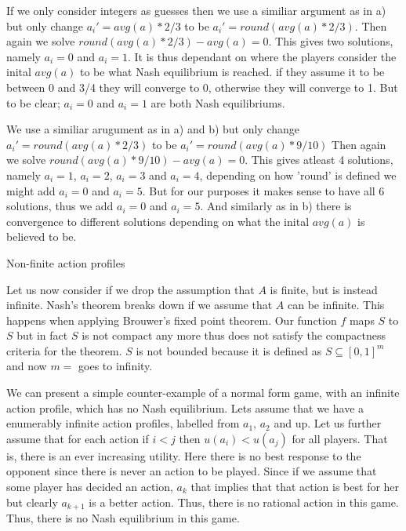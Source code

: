 \documentclass[12pt]{article}
\newenvironment{question}[2][Question]{\begin{trivlist}
\item[\hskip \labelsep {\bfseries #1}\hskip \labelsep {\bfseries #2.}]}{\end{trivlist}}
\newenvironment{answer}[2][Answer]{\begin{trivlist}
\item[\hskip \labelsep {\bfseries #1}\hskip \labelsep {\bfseries #2:}]}{\end{trivlist}}
\begin{document}
\begin{answer}{b)}
If we only consider integers as guesses then we use a similiar argument as in a) but only change $a_i'=avg(a)*2/3$ to be $a_i'=round(avg(a)*2/3)$.
Then again we solve $round(avg(a)*2/3) - avg(a)=0$.
This gives two solutions, namely $a_i=0$ and $a_i=1$.
It is thus dependant on where the players consider the inital $avg(a)$ to be what Nash equilibrium is reached. if they assume it to be between 0 and 3/4 they will converge to 0, otherwise they will converge to 1. But to be clear; $a_i=0$ and $a_i=1$ are both Nash equilibriums.
\end{answer}
\begin{answer}{c)}
We use a similiar arugument as in a) and b) but only change $a_i'=round(avg(a)*2/3)$ to be $a_i'=round(avg(a)*9/10)$
Then again we solve $round(avg(a)*9/10) - avg(a)=0$.
This gives atleast 4 solutions, namely $a_i=1$, $a_i=2$, $a_i=3$ and $a_i=4$, depending on how 'round' is defined we might add  $a_i=0$ and $a_i=5$. But for our purposes it makes sense to have all 6 solutions, thus we add $a_i=0$ and $a_i=5$. And similarly as in b) there is convergence to different solutions depending on what the inital $avg(a)$ is believed to be.
\end{answer}
\begin{question}{3}
Non-finite action profiles
\end{question}
\begin{answer}{a)}
Let us now consider if we drop the assumption that $A$ is finite, but is instead infinite. Nash's theorem breaks down if we assume that $A$ can be infinite. This happens when applying Brouwer's fixed point theorem. Our function $f$ maps $S$ to $S$ but in fact $S$ is not compact any more thus does not satisfy the compactness criteria for the theorem. $S$ is not bounded because it is defined as $S \subseteq [0,1]^{m}$ and now $m=$ goes to infinity.
\end{answer}
\begin{answer}{b)}
We can present a simple counter-example of a normal form game, with an infinite action profile, which has no Nash equilibrium. Lets assume that we have a enumerably infinite action profiles, labelled from $a_1$, $a_2$ and up. Let us further assume that for each action if $i<j$ then $u(a_i)<u(a_j)$ for all players. That is, there is an ever increasing utility. Here there is no best response to the opponent since there is never an action to be played. Since if we assume that some player has decided an action, $a_k$ that implies that that action is best for her but clearly $a_{k+1}$ is a better action. Thus, there is no rational action in this game. Thus, there is no Nash equilibrium in this game.
\end{answer}
\end{document}
